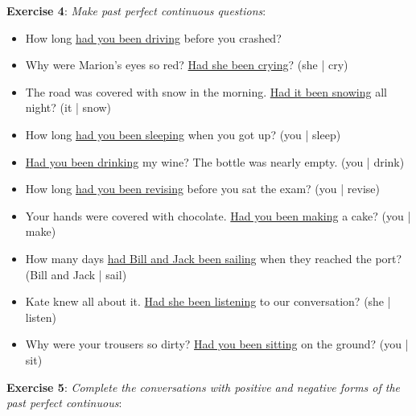 \textbf{Exercise 4}: \textit{Make past perfect continuous questions}:

\begin{itemize}

\item How long \underline{had you been driving} before you crashed?
\item Why were Marion's eyes so red? \underline{Had she been crying}? (she | cry)
\item The road was covered with snow in the morning. \underline{Had it been snowing} all night? (it | snow)
\item How long \underline{had you been sleeping} when you got up? (you | sleep)
\item \underline{Had you been drinking} my wine? The bottle was nearly empty. (you | drink) 
\item How long \underline{had you been revising} before you sat the exam? (you | revise)
\item Your hands were covered with chocolate. \underline{Had you been making} a cake? (you | make)
\item How many days \underline{had Bill and Jack been sailing} when they reached the port? (Bill and Jack | sail)
\item Kate knew all about it. \underline{Had she been listening} to our conversation? (she | listen)
\item Why were your trousers so dirty? \underline{Had you been sitting} on the ground? (you | sit)

\end{itemize}

\textbf{Exercise 5}: \textit{Complete the conversations with positive and negative forms of the past perfect continuous}:


